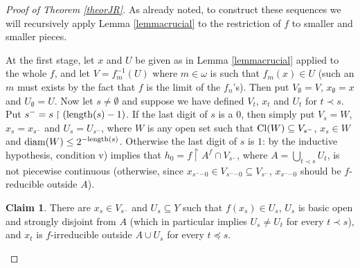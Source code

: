 \documentclass{rae}
\def\leng{{\rm length}}
\def\diam{{\rm diam}}
\def\Cl{{\rm Cl}}
\newcommand{\conc}{{}^\smallfrown}
\newcommand{\restr}[2]{#1 \restriction #2}
\theoremstyle{definition}
\newtheorem*{claim}{Claim}
\begin{document}
\begin{proof}[Proof of Theorem \ref{theorJR}]
As already noted, to construct these sequences we will recursively apply
Lemma \ref{lemmacrucial} to the restriction of $f$ to smaller and smaller
pieces. 

At the first stage, let $x$ and $U$ be given as in Lemma \ref{lemmacrucial}
applied to the whole $f$, 
and let $V = f_m^{-1}(U)$ where $m \in \omega$ is such that $f_m(x) \in 
U$ (such an $m$ must exists by the fact that $f$ is the limit of the 
$f_n$'s). Then put $V_\emptyset=V$, $x_\emptyset = x$ and 
$U_\emptyset = U$. Now let $s \neq \emptyset$ and suppose we have 
defined $V_t$, $x_t$ and $U_t$ for $t \prec s$. Put $s^- = \restr{s}{(\leng(s)-1)}$. If the last digit 
of $s$ is a $0$, then simply put $V_s = W$, $x_s = x_{s^-}$ and 
$U_s = U_{s^-}$, where $W$ is any open set such that $\Cl(W) 
\subseteq V_{s^-}$, $x_s \in W$ and $\diam(W) \leq 2^{-\leng(s)}$. 
Otherwise the last digit of $s$ is $1$: by the inductive hypothesis, condition v) 
implies that $h_0 = \restr{f}{A^f \cap V_{s^-}}$, where $A = \bigcup_{t
  \prec s}  U_t$,
is not piecewise continuous (otherwise, since $x_{s^- \conc 0} \in
V_{s^- \conc 0} 
\subseteq V_{s^-}$, $x_{s^- \conc 0}$
should be $f$-reducible outside $A$). 

\begin{claim}
There are $x_s \in V_{s^-}$ and $U_s \subseteq Y$ such that $f(x_s) \in
U_s$, $U_s$  
is basic open and strongly disjoint from $A$ (which in particular implies $U_s \neq
U_t$ for every 
$t \prec s$), and $x_t$ is $f$-irreducible outside $A\cup U_s$
for every  $t \preceq s$.
\end{claim}


\end{proof}
\end{document}
